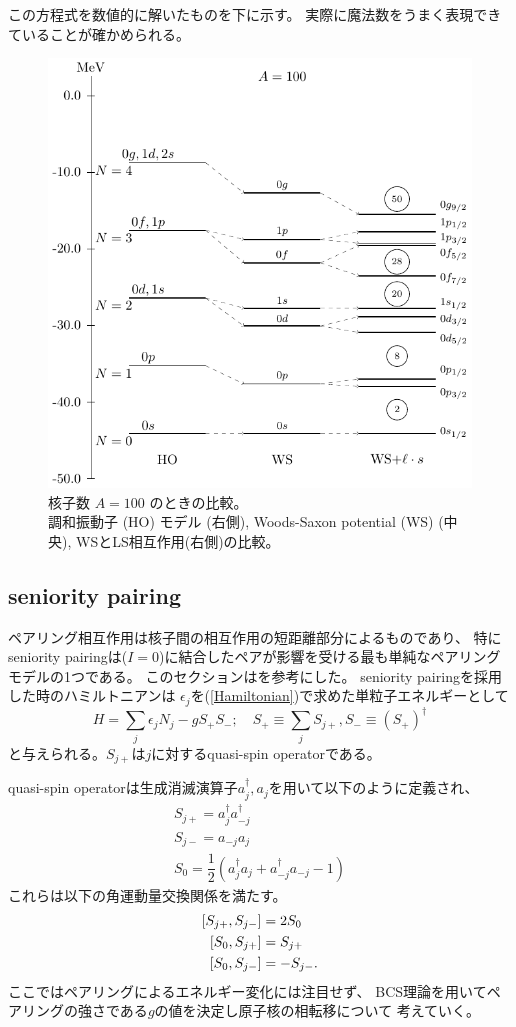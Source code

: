 \documentclass[a4paper]{jsarticle}
\begin{document}
この方程式を数値的に解いたものを下に示す。
実際に魔法数をうまく表現できていることが確かめられる。
\begin{figure}[H]
  \centering
  \includegraphics[width=.8\textwidth]{main_fig/tot.pdf}
  \captionsetup{width=0.8\textwidth}
  \caption{核子数 $A=100$ のときの比較。\\調和振動子 (HO) モデル (右側), 
  Woods-Saxon potential (WS) (中央),
  WSとLS相互作用(右側)の比較。}
  \label{fig:HOvsWSvsls}
\end{figure}

\subsection{seniority pairing}\label{sec.seniority}
ペアリング相互作用は核子間の相互作用の短距離部分によるものであり、
特にseniority pairingは($I=0$)に結合したペアが影響を受ける最も単純なペアリングモデルの1つである。
このセクションは\cite{thenuclearmanybody}を参考にした。
seniority pairingを採用した時のハミルトニアンは
$\epsilon_j$を(\ref{Hamiltonian})で求めた単粒子エネルギーとして
\begin{equation}
  H=\sum_{j}\epsilon_jN_j -gS_+S_-;\quad S_+\equiv\sum_j S_{j+},S_-\equiv(S_+)^{\dagger}
\end{equation}
と与えられる。$S_{j+}$は$j$に対するquasi-spin operatorである。\par
quasi-spin operatorは生成消滅演算子$a_j^\dagger,a_j$を用いて以下のように定義され、
\begin{align}
  S_{j+}=a_j^\dagger a_{-j}^\dagger\\
  S_{j-}=a_{-j} a_{j}\\
  S_0 = \dfrac{1}{2}\left(a_j^\dagger a_{j} +a_{-j}^\dagger a_{-j} - 1\right)
\end{align}
これらは以下の角運動量交換関係を満たす。
\begin{align*}
  \comm{S_{j+}}{S_{j-}}&=2S_0\\
  \comm{S_0}{S_{j+}}&=S_{j+}\\
  \comm{S_0}{S_{j-}}&=-S_{j-}.
\end{align*}
ここではペアリングによるエネルギー変化には注目せず、
BCS理論を用いてペアリングの強さである$g$の値を決定し原子核の相転移について
考えていく。
\end{document}
